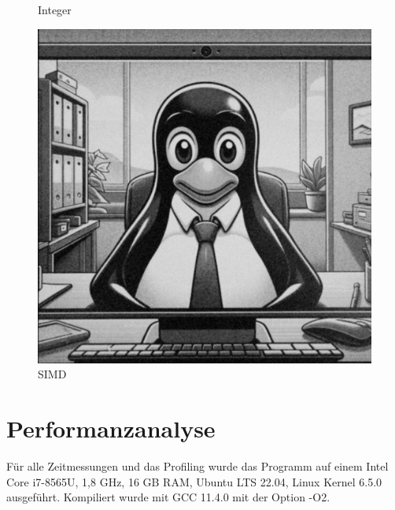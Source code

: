 \documentclass[course=erap]{aspdoc}
\begin{document}
\begin{figure}
\begin{minipage}[t]{.33\linewidth}
        \caption{Integer}
        \label{fig:integer}
    \end{minipage}%
    \begin{minipage}[t]{.33\linewidth}
        \centering
        \includegraphics[width=\linewidth]{Image/Sample_VideoCall/denoisedvideocall_simd.png}
        \caption{SIMD}
        \label{fig:simd}
    \end{minipage}
\end{figure}

\section{Performanzanalyse}

Für alle Zeitmessungen und das Profiling wurde das Programm auf einem Intel Core i7-8565U, 1,8 GHz, 16 GB RAM, Ubuntu LTS 22.04, Linux Kernel 6.5.0 ausgeführt. Kompiliert wurde mit GCC 11.4.0 mit der Option -O2.
\end{document}
